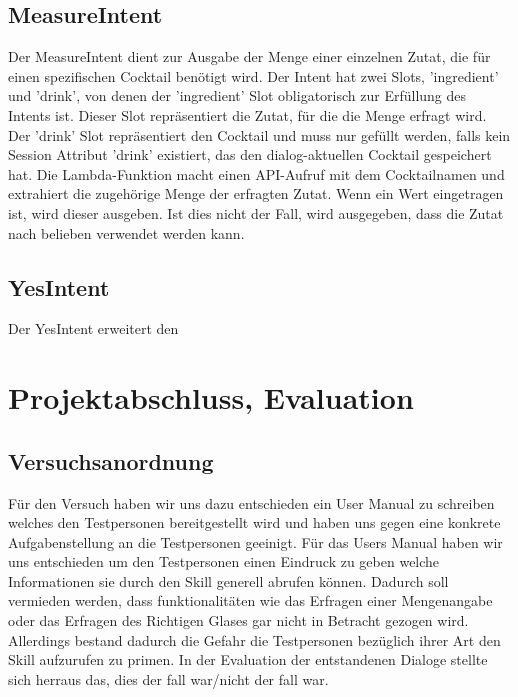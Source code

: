 \documentclass[12pt,letterpaper]{article}
\begin{document}
\subsection{MeasureIntent}
Der MeasureIntent dient zur Ausgabe der Menge einer einzelnen Zutat, die für einen spezifischen Cocktail benötigt wird.
Der Intent hat zwei Slots, 'ingredient' und 'drink', von denen der 'ingredient' Slot obligatorisch zur Erfüllung des Intents ist. 
Dieser Slot repräsentiert die Zutat, für die die Menge erfragt wird. Der 'drink' Slot repräsentiert den Cocktail und muss nur gefüllt werden,
falls kein Session Attribut 'drink' existiert, das den dialog-aktuellen Cocktail gespeichert hat.
Die Lambda-Funktion macht einen API-Aufruf mit dem Cocktailnamen und extrahiert die zugehörige Menge der erfragten Zutat.
Wenn ein Wert eingetragen ist, wird dieser ausgeben. Ist dies nicht der Fall, wird ausgegeben, dass die Zutat nach belieben verwendet werden kann. \\


\subsection{YesIntent}
Der YesIntent erweitert den 

\section{Projektabschluss, Evaluation}
\subsection{Versuchsanordnung}
Für den Versuch haben wir uns dazu entschieden ein User Manual zu schreiben welches den Testpersonen
bereitgestellt wird und haben uns gegen eine konkrete Aufgabenstellung an die Testpersonen geeinigt. Für das Users Manual haben wir uns entschieden um den Testpersonen einen Eindruck zu geben welche Informationen sie durch den Skill generell abrufen können. Dadurch soll vermieden werden, dass funktionalitäten wie das Erfragen einer Mengenangabe oder das Erfragen des Richtigen Glases gar nicht in Betracht gezogen wird. Allerdings bestand dadurch die Gefahr die Testpersonen bezüglich ihrer Art den Skill aufzurufen zu primen.
In der Evaluation der entstandenen Dialoge stellte sich herraus das, dies der fall war/nicht der fall war.
\\
 
\end{document}
